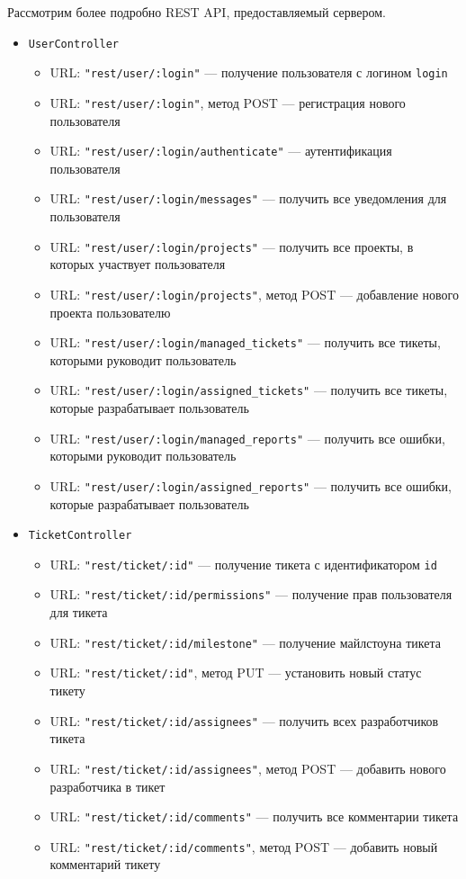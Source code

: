 	Рассмотрим более подробно REST API, предоставляемый сервером.
	\begin{itemize}
		\item \texttt{UserController}
		\begin{itemize}
			\item URL: \texttt{"rest/user/:login"} --- получение пользователя с логином \texttt{login}
			\item URL: \texttt{"rest/user/:login"}, метод POST --- регистрация нового пользователя
			\item URL: \texttt{"rest/user/:login/authenticate"} --- аутентификация пользователя
			\item URL: \texttt{"rest/user/:login/messages"} --- получить все уведомления для пользователя
			\item URL: \texttt{"rest/user/:login/projects"} --- получить все проекты, в которых участвует пользователя
			\item URL: \texttt{"rest/user/:login/projects"}, метод POST --- добавление нового проекта пользователю
			\item URL: \texttt{"rest/user/:login/managed\_tickets"} --- получить все тикеты, которыми руководит пользователь
			\item URL: \texttt{"rest/user/:login/assigned\_tickets"} --- получить все тикеты, которые разрабатывает пользователь
			\item URL: \texttt{"rest/user/:login/managed\_reports"} --- получить все ошибки, которыми руководит пользователь
			\item URL: \texttt{"rest/user/:login/assigned\_reports"} --- получить все ошибки, которые разрабатывает пользователь
		\end{itemize}
		
		\item \texttt{TicketController}
		\begin{itemize}
			\item URL: \texttt{"rest/ticket/:id"} --- получение тикета с идентификатором \texttt{id}
			\item URL: \texttt{"rest/ticket/:id/permissions"} --- получение прав пользователя для тикета
			\item URL: \texttt{"rest/ticket/:id/milestone"} --- получение майлстоуна тикета
			\item URL: \texttt{"rest/ticket/:id"}, метод PUT --- установить новый статус тикету
			\item URL: \texttt{"rest/ticket/:id/assignees"} --- получить всех разработчиков тикета
			\item URL: \texttt{"rest/ticket/:id/assignees"}, метод POST --- добавить нового разработчика в тикет
			\item URL: \texttt{"rest/ticket/:id/comments"} --- получить все комментарии тикета
			\item URL: \texttt{"rest/ticket/:id/comments"}, метод POST --- добавить новый комментарий тикету
		\end{itemize}
		

\end{itemize}
